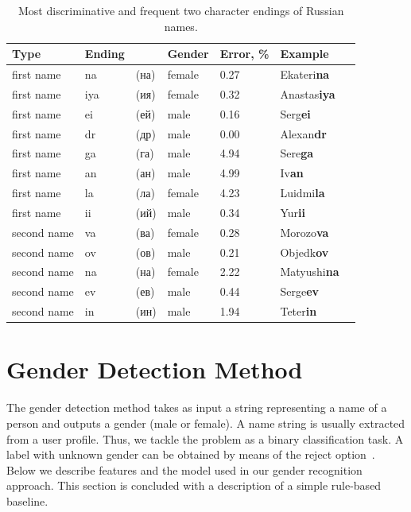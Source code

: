 \documentclass[runningheads,a4paper]{llncs}
\newcommand\textcyr[1]{{\fontencoding{OT2}\fontfamily{wncyr}\selectfont #1}}
\begin{document}
\begin{table}[h]

\footnotesize

\begin{center}
\begin{tabular}{|l|ll|l|l|l|l|}
\hline
\bf Type & \bf Ending & & \bf Gender & \bf Error, \% &  \bf Example \\ \hline \hline

first name & na & (\textcyr{на}) & female & 0.27 & Ekateri\textbf{na} \\
first name & iya & (\textcyr{ия}) & female & 0.32 & Anastas\textbf{iya} \\
first name & ei & (\textcyr{ей}) &  male & 0.16 & Serg\textbf{ei} \\
first name & dr & (\textcyr{др}) & male & 0.00 & Alexan\textbf{dr} \\
first name & ga & (\textcyr{га}) & male & 4.94 & Sere\textbf{ga} \\
first name & an  & (\textcyr{ан}) & male & 4.99 & Iv\textbf{an} \\
first name & la & (\textcyr{ла}) & female & 4.23 & Luidmi\textbf{la} \\
first name & ii & (\textcyr{ий}) & male & 0.34 & Yur\textbf{ii} \\
second name & va & (\textcyr{ва})  & female & 0.28 & Morozo\textbf{va} \\
second name & ov & (\textcyr{ов})  & male & 0.21 & Objedk\textbf{ov} \\
second name & na & (\textcyr{на})  & female & 2.22 & Matyushi\textbf{na} \\
second name & ev & (\textcyr{ев}) & male & 0.44 & Serge\textbf{ev} \\
second name & in & (\textcyr{ин}) & male & 1.94 & Teter\textbf{in} \\
 
\hline
\end{tabular}
\end{center}
\caption{ Most discriminative and frequent two character endings of Russian names.  }
\label{tab:endings}
\end{table}

\section{Gender Detection Method}

The gender detection method takes as input a string representing a name of a person and outputs a gender (male or female). A name string is usually extracted from a user profile. Thus, we tackle the problem as a binary classification task. A label with unknown gender can be obtained by means of the reject option~\cite[p.42]{bishop2006pattern}. Below we describe features and the model used in our gender recognition approach. This section is concluded with a description of a simple rule-based baseline.
\end{document}
